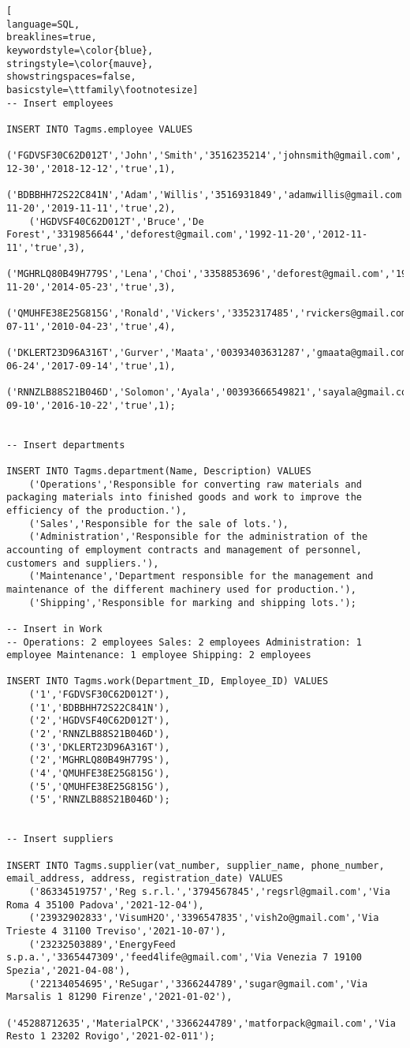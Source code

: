 \begin{lstlisting}[
language=SQL,
breaklines=true,
keywordstyle=\color{blue},
stringstyle=\color{mauve},
showstringspaces=false,
basicstyle=\ttfamily\footnotesize]
-- Insert employees

INSERT INTO Tagms.employee VALUES
    ('FGDVSF30C62D012T','John','Smith','3516235214','johnsmith@gmail.com','1995-12-30','2018-12-12','true',1),
    ('BDBBHH72S22C841N','Adam','Willis','3516931849','adamwillis@gmail.com','1993-11-20','2019-11-11','true',2),
    ('HGDVSF40C62D012T','Bruce','De Forest','3319856644','deforest@gmail.com','1992-11-20','2012-11-11','true',3),
    ('MGHRLQ80B49H779S','Lena','Choi','3358853696','deforest@gmail.com','1992-11-20','2014-05-23','true',3),
    ('QMUHFE38E25G815G','Ronald','Vickers','3352317485','rvickers@gmail.com','1998-07-11','2010-04-23','true',4),
    ('DKLERT23D96A316T','Gurver','Maata','00393403631287','gmaata@gmail.com','1953-06-24','2017-09-14','true',1),
    ('RNNZLB88S21B046D','Solomon','Ayala','00393666549821','sayala@gmail.com','1952-09-10','2016-10-22','true',1);


-- Insert departments

INSERT INTO Tagms.department(Name, Description) VALUES
    ('Operations','Responsible for converting raw materials and packaging materials into finished goods and work to improve the efficiency of the production.'),
    ('Sales','Responsible for the sale of lots.'),
    ('Administration','Responsible for the administration of the accounting of employment contracts and management of personnel, customers and suppliers.'),
    ('Maintenance','Department responsible for the management and maintenance of the different machinery used for production.'),
    ('Shipping','Responsible for marking and shipping lots.');

-- Insert in Work
-- Operations: 2 employees Sales: 2 employees Administration: 1 employee Maintenance: 1 employee Shipping: 2 employees

INSERT INTO Tagms.work(Department_ID, Employee_ID) VALUES
    ('1','FGDVSF30C62D012T'),
    ('1','BDBBHH72S22C841N'),
    ('2','HGDVSF40C62D012T'),
    ('2','RNNZLB88S21B046D'),
    ('3','DKLERT23D96A316T'),
    ('2','MGHRLQ80B49H779S'),
    ('4','QMUHFE38E25G815G'),
    ('5','QMUHFE38E25G815G'),
    ('5','RNNZLB88S21B046D');


-- Insert suppliers

INSERT INTO Tagms.supplier(vat_number, supplier_name, phone_number, email_address, address, registration_date) VALUES
    ('86334519757','Reg s.r.l.','3794567845','regsrl@gmail.com','Via Roma 4 35100 Padova','2021-12-04'),
    ('23932902833','VisumH2O','3396547835','vish2o@gmail.com','Via Trieste 4 31100 Treviso','2021-10-07'),
    ('23232503889','EnergyFeed s.p.a.','3365447309','feed4life@gmail.com','Via Venezia 7 19100 Spezia','2021-04-08'),
    ('22134054695','ReSugar','3366244789','sugar@gmail.com','Via Marsalis 1 81290 Firenze','2021-01-02'),
    ('45288712635','MaterialPCK','3366244789','matforpack@gmail.com','Via Resto 1 23202 Rovigo','2021-02-011');





\end{lstlisting}
